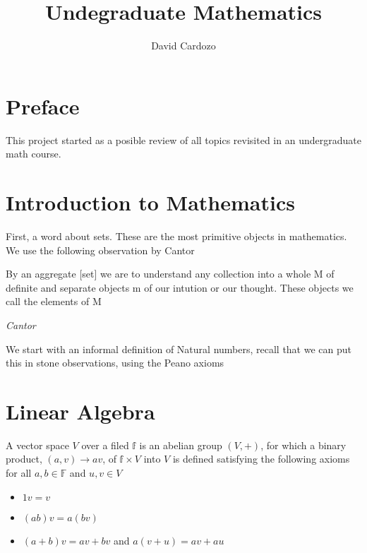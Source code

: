 \documentclass[11pt,twoside]{book}
\title{Undegraduate Mathematics}
\author{David Cardozo}
\begin{document}
\maketitle
\chapter{Preface}
This project started as a posible review of all topics revisited in an undergraduate math course.

\mainmatter
\chapter{Introduction to Mathematics}
First, a word about sets. These are the most primitive objects in mathematics. We use the following observation by Cantor

\epigraph{By an aggregate [set] we are to understand any collection into a whole M of definite and separate objects m of our intution or our thought. These objects we call the elements of M}{\textit{Cantor}}

We start with an informal definition of Natural numbers, recall that we can put this in stone observations, using the Peano axioms

\chapter{Linear Algebra}

A vector space $V$ over a filed $\mathbb{f}$ is an abelian group $(V,+)$, for which a binary product, $(a,v) \rightarrow av$, of $ \mathbb{f} \times V$ into $V$ is defined satisfying the following axioms for all $a,b \in \mathbb{F}$ and $u,v \in V$

\begin{itemize}
    \item $1v = v$
    \item $(ab)v = a(bv) $
    \item $(a + b)v = av + bv$ and $a(v+u) = av + au$
\end{itemize}
\end{document}
